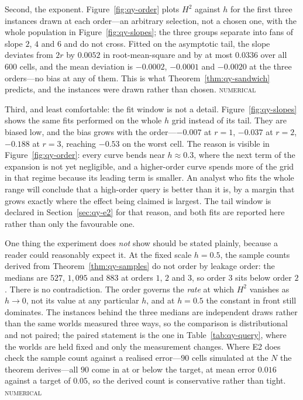 \documentclass[conference]{IEEEtran}
\theoremstyle{definition}
\newcommand{\NUM}{\textsc{numerical}}
\begin{document}
Second, the exponent. Figure~\ref{fig:qy-order} plots $H^{2}$ against $h$ for the first three
instances drawn at each order---an arbitrary selection, not a chosen one, with the whole
population in Figure~\ref{fig:qy-slopes}; the three groups separate into fans of slope $2$, $4$ and $6$ and do
not cross. Fitted on the asymptotic tail, the slope deviates from $2r$ by $0.0052$ in
root-mean-square and by at most $0.0336$ over all $600$ cells, and the mean deviation is
$-0.0002$, $-0.0001$ and $-0.0020$ at the three orders---no bias at any of them. This is what
Theorem~\ref{thm:qy-sandwich} predicts, and the instances were drawn rather than chosen.
\NUM{}

Third, and least comfortable: the fit window is not a detail. Figure~\ref{fig:qy-slopes} shows the
same fits performed on the whole $h$ grid instead of its tail. They are biased low, and the
bias grows with the order---$-0.007$ at $r=1$, $-0.037$ at $r=2$, $-0.188$ at $r=3$, reaching
$-0.53$ on the worst cell. The reason is visible in Figure~\ref{fig:qy-order}: every curve bends
near $h\approx0.3$, where the next term of the expansion is not yet negligible, and a
higher-order curve spends more of the grid in that regime because its leading term is smaller.
An analyst who fits the whole range will conclude that a high-order query is better than it is,
by a margin that grows exactly where the effect being claimed is largest. The tail window is
declared in Section~\ref{sec:qy-e2} for that reason, and both fits are reported here rather than
only the favourable one.

One thing the experiment does \emph{not} show should be stated plainly, because a reader could
reasonably expect it. At the fixed scale $h=0.5$, the sample counts derived from
Theorem~\ref{thm:qy-samples} do not order by leakage order: the medians are $527$, $1{,}095$ and
$883$ at orders $1$, $2$ and $3$, so order $3$ sits below order $2$. There is no contradiction.
The order governs the \emph{rate} at which $H^{2}$ vanishes as $h\to0$, not its value at any
particular $h$, and at $h=0.5$ the constant in front still dominates. The instances behind the
three medians are independent draws rather than the same worlds measured three ways, so the
comparison is distributional and not paired; the paired statement is the one in
Table~\ref{tab:qy-query}, where the worlds are held fixed and only the measurement changes.
Where E2 does check the sample count against a realised error---$90$ cells simulated at the $N$
the theorem derives---all $90$ come in at or below the target, at mean error $0.016$ against a
target of $0.05$, so the derived count is conservative rather than tight. \NUM{}
\end{document}
